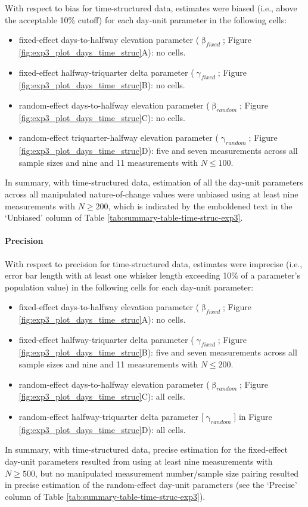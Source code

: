 \documentclass[
12pt, %
twoside,
english]{guelphthesis}
\begin{document}
With respect to bias for time-structured data, estimates were biased (i.e., above the acceptable 10\% cutoff) for each day-unit parameter in the following cells:
\begin{itemize}
\tightlist
\item
  fixed-effect days-to-halfway elevation parameter (\(\upbeta_{fixed}\); Figure \ref{fig:exp3_plot_days_time_struc}A): no cells.
\item
  fixed-effect halfway-triquarter delta parameter (\(\upgamma_{fixed}\); Figure \ref{fig:exp3_plot_days_time_struc}B): no cells.
\item
  random-effect days-to-halfway elevation parameter (\(\upbeta_{random}\); Figure \ref{fig:exp3_plot_days_time_struc}C): no cells.
\item
  random-effect triquarter-halfway elevation parameter (\(\upgamma_{random}\); Figure \ref{fig:exp3_plot_days_time_struc}D): five and seven measurements across all sample sizes and nine and 11 measurements with \(N \le 100\).
\end{itemize}
In summary, with time-structured data, estimation of all the day-unit parameters across all manipulated nature-of-change values were unbiased using at least nine measurements with \(N \ge 200\), which is indicated by the emboldened text in the `Unbiased' column of Table \ref{tab:summary-table-time-struc-exp3}.

\hypertarget{precision-time-struc-exp3}{%
\paragraph{Precision}\label{precision-time-struc-exp3}}

With respect to precision for time-structured data, estimates were imprecise (i.e., error bar length with at least one whisker length exceeding 10\% of a parameter's population value) in the following cells for each day-unit parameter:
\begin{itemize}
\tightlist
\item
  fixed-effect days-to-halfway elevation parameter (\(\upbeta_{fixed}\); Figure \ref{fig:exp3_plot_days_time_struc}A): no cells.
\item
  fixed-effect halfway-triquarter delta parameter (\(\upgamma_{fixed}\); Figure \ref{fig:exp3_plot_days_time_struc}B): five and seven measurements across all sample sizes and nine and 11 measurements with \(N \le 200\).
\item
  random-effect days-to-halfway elevation parameter (\(\upbeta_{random}\); Figure \ref{fig:exp3_plot_days_time_struc}C): all cells.
\item
  random-effect halfway-triquarter delta parameter {[}\(\upgamma_{random}\){]} in Figure \ref{fig:exp3_plot_days_time_struc}D): all cells.
\end{itemize}
In summary, with time-structured data, precise estimation for the fixed-effect day-unit parameters resulted from using at least nine measurements with \(N \ge 500\), but no manipulated measurement number/sample size pairing resulted in precise estimation of the random-effect day-unit parameters (see the `Precise' column of Table \ref{tab:summary-table-time-struc-exp3}).
\end{document}
